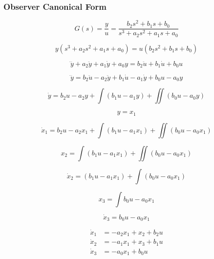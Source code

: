 \subsubsection{Observer Canonical Form}

\begin{equation*}
  G(s)=\frac{y}{u}=\frac{b_2s^2+b_1s+b_0}{s^3+a_2s^2+a_1s+a_0}
\end{equation*}

\begin{equation*}
  {y}{(s^3+a_2s^2+a_1s+a_0)}={u}{(b_2s^2+b_1s+b_0)}
\end{equation*}

\begin{equation*}
  \dddot{y}+a_2\ddot{y}+a_1\dot{y}+a_0y=b_2\ddot{u}+b_1\dot{u}+b_0u
\end{equation*}

\begin{equation*}
  \dddot{y}=b_2\ddot{u}-a_2\ddot{y}+b_1\dot{u}-a_1\dot{y}+b_0u-a_0y
\end{equation*}

\begin{equation*}
  \dot{y}=b_2{u}-a_2{y}+\int(b_1{u}-a_1{y})+\iint(b_0u-a_0y)
\end{equation*}

\begin{equation*}
  y=x_1
\end{equation*}

\begin{equation*}
  \dot{x}_1=b_2{u}-a_2{x}_1+\int(b_1{u}-a_1{x_1})+\iint(b_0u-a_0x_1)
\end{equation*}

\begin{equation*}
  x_2=\int(b_1{u}-a_1{x_1})+\iint(b_0u-a_0x_1)
\end{equation*}

\begin{equation*}
  \dot{x}_2=(b_1{u}-a_1{x_1})+\int(b_0u-a_0x_1)
\end{equation*}

\begin{equation*}
  x_3=\int{b_0u-a_0x_1}
\end{equation*}

\begin{equation*}
  \dot{x}_3={b_0u-a_0x_1}
\end{equation*}

\begin{equation*}
  \begin{split}
    \dot{x}_1&=-a_2{x}_1+x_2+b_2{u} \\
    \dot{x}_2&=-a_1{x_1}+x_3+b_1{u} \\
    \dot{x}_3&=-a_0x_1+b_0u
  \end{split}
\end{equation*}

